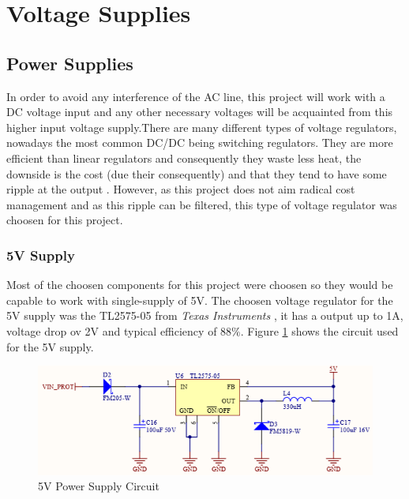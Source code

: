\section{Voltage Supplies}\label{sec:voltage-supplies}

	\subsection{Power Supplies}\label{ssec:power-supplies}
		In order to avoid any interference of the AC line, this project will work with a DC voltage input and any other necessary voltages will be acquainted from this higher input voltage supply.There are many different types of voltage regulators, nowadays the most common DC/DC being switching regulators. They are more efficient than linear regulators and consequently they waste less heat, the downside is the cost (due their consequently) and that they tend to have some ripple at the output \cite{schweber2017}. However, as this project does not aim radical cost management and as this ripple can be filtered, this type of voltage regulator was choosen for this project.

		\subsubsection{5V Supply}\label{sssec:5v-supply}
			Most of the choosen components for this project were choosen so they would be capable to work with single-supply of 5V. The choosen voltage regulator for the 5V supply was the TL2575-05 from \textit{Texas Instruments} \cite{tl2575-05-datasheet}, it has a output up to 1A, voltage drop ov 2V and typical efficiency of 88$\%$. Figure \ref{fig:tl2575-05-circuit} shows the circuit used for the 5V supply.

			\begin{figure}[htbp]
				\centering
					\includegraphics[scale=0.4]{figuras/fig-tl2575-05-circuit.png}
				\caption{5V Power Supply Circuit \cite{tl2575-05-circuit}}
				\label{fig:tl2575-05-circuit}
			\end{figure}

